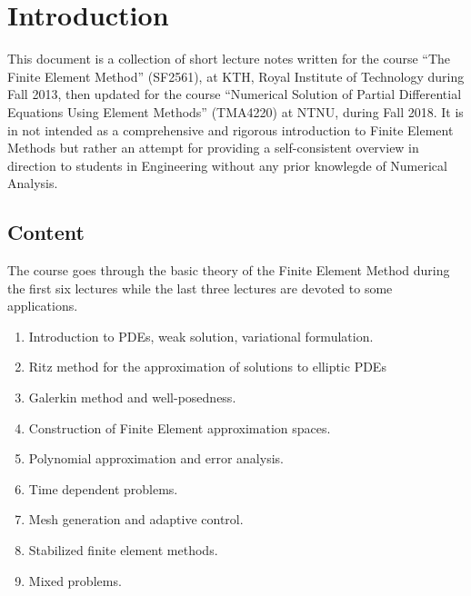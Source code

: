 
\section*{Introduction}

This document is a collection of short lecture notes written for the course ``The Finite Element Method'' (SF2561), at KTH, Royal Institute of Technology during Fall 2013, then updated for the course ``Numerical Solution of Partial Differential Equations Using Element Methods'' (TMA4220) at NTNU, during Fall 2018. It is in not intended as a comprehensive and rigorous introduction to Finite Element Methods but rather an attempt for providing a self-consistent overview in direction to students in Engineering without any prior knowlegde of Numerical Analysis.

\subsection*{Content}
The course goes through the basic theory of the Finite Element Method during the first six lectures while the last three lectures are devoted to some applications.

\medskip
\begin{enumerate}
\item Introduction to PDEs, weak solution, variational formulation.
\item Ritz method for the approximation of solutions to elliptic PDEs
\item Galerkin method and well-posedness.
\item Construction of Finite Element approximation spaces.
\item Polynomial approximation and error analysis.
\item Time dependent problems.
\item Mesh generation and adaptive control.
\item Stabilized finite element methods.
\item Mixed problems.
\end{enumerate}

